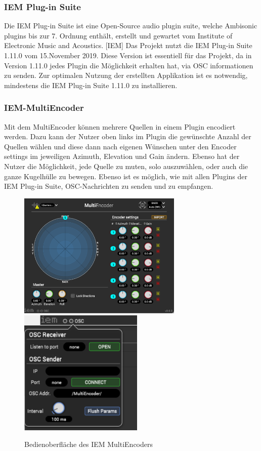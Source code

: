 \documentclass[11pt, titlepage, fleqn]{report}
\begin{document}
                \subsubsection{IEM Plug-in Suite}
                \label{sec:3.1.3}
                    Die IEM Plug-in Suite ist eine Open-Source audio plugin suite, welche Ambisonic plugins bis zur 7. Ordnung enthält, erstellt und gewartet vom Institute of 
                    Electronic Music and Acoustics. [IEM]\newline
                    Das Projekt nutzt die IEM Plug-in Suite 1.11.0 vom 15.November 2019. Diese Version ist essentiell für das Projekt, da in Version 1.11.0 jedes 
                    Plugin die Möglichkeit erhalten hat, via OSC informationen zu senden. Zur optimalen Nutzung der erstellten Applikation ist es notwendig, mindestens 
                    die IEM Plug-in Suite 1.11.0 zu installieren.                
                \subsubsection{IEM-MultiEncoder}
                    Mit dem MultiEncoder können mehrere Quellen in einem Plugin encodiert werden. Dazu kann der Nutzer oben links im Plugin die gewünschte 
                    Anzahl der Quellen wählen und diese dann nach eigenen Wünschen unter den Encoder settings im jeweiligen Azimuth, Elevation und Gain ändern. 
                    Ebenso hat der Nutzer die Möglichkeit, jede Quelle zu muten, solo auszuwählen, oder auch die ganze Kugelhülle zu bewegen.
                    Ebenso ist es möglich, wie mit allen Plugins der IEM Plug-in Suite, OSC-Nachrichten zu senden und zu empfangen.
                    \begin{figure}[htbp]
                        \centering
                        \includegraphics[height=6cm]{./img/MultiEncoder.png}
                        \includegraphics[height=6cm]{./img/MultiEncoderOSC.png}
                        \caption{Bedienoberfläche des IEM MultiEncoders \label{fig:MultiEncoder}}
                    \end{figure}
\end{document}
